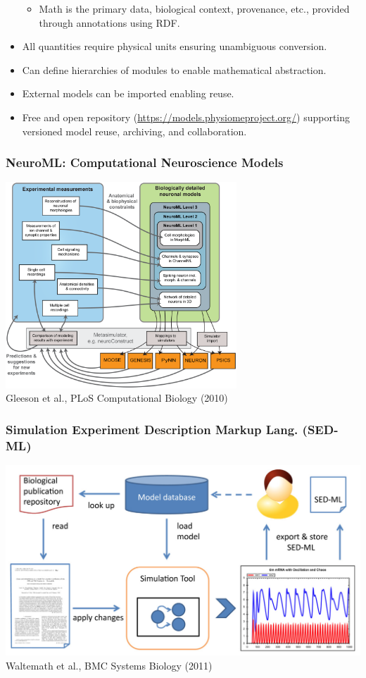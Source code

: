 \documentclass{beamer}
\begin{document}
\begin{frame}
\begin{itemize}
\begin{itemize}
\item Math is the primary data, biological context, provenance, etc., provided through annotations using RDF.
\end{itemize}
\item All quantities require physical units ensuring unambiguous conversion. %
\item Can define hierarchies of modules to enable mathematical abstraction.
\item External models can be imported enabling reuse.
\item Free and open repository (\url{https://models.physiomeproject.org/}) supporting versioned model reuse, archiving, and collaboration.
\end{itemize}
\end{frame}

\begin{frame}\frametitle{NeuroML: Computational Neuroscience Models}
\begin{center}
\includegraphics[width=0.65\textwidth]{figs/NeuroML}\\
Gleeson et al., PLoS Computational Biology (2010)
\end{center}
\end{frame}

\begin{frame}\frametitle{Simulation Experiment Description Markup Lang. (SED-ML)}
\begin{center}
\includegraphics[width=\textwidth]{figs/SED-ML}\\
Waltemath et al., BMC Systems Biology (2011)
\end{center}
\end{frame}
\end{document}
